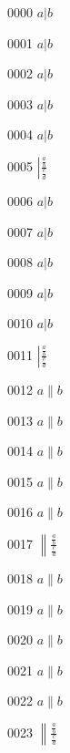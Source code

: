 \documentclass{article}
\begin{document}
0000 $a\lvert b$\par
0001 $a\big\lvert b$\par
0002 $a\Big\lvert b$\par
0003 $a\bigg\lvert b$\par
0004 $a\Bigg\lvert b$\par
0005 $\left\lvert \frac{\frac{a}{b}}{\frac{c}{d}}\right.$\par
0006 $a\rvert b$\par
0007 $a\big\rvert b$\par
0008 $a\Big\rvert b$\par
0009 $a\bigg\rvert b$\par
0010 $a\Bigg\rvert b$\par
0011 $\left\rvert \frac{\frac{a}{b}}{\frac{c}{d}}\right.$\par
0012 $a\lVert b$\par
0013 $a\big\lVert b$\par
0014 $a\Big\lVert b$\par
0015 $a\bigg\lVert b$\par
0016 $a\Bigg\lVert b$\par
0017 $\left\lVert \frac{\frac{a}{b}}{\frac{c}{d}}\right.$\par
0018 $a\rVert b$\par
0019 $a\big\rVert b$\par
0020 $a\Big\rVert b$\par
0021 $a\bigg\rVert b$\par
0022 $a\Bigg\rVert b$\par
0023 $\left\rVert \frac{\frac{a}{b}}{\frac{c}{d}}\right.$\par
\end{document}
